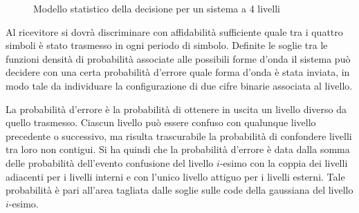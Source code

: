 \begin{figure}[ht!]\centering
	\def\var{.707}
	\caption{Modello statistico della decisione per un sistema a 4 livelli}
	\label{fig:trasmissione_numerica_modello_statistico_decisione_multilivello}
\end{figure}

Al ricevitore si dovrà discriminare con affidabilità sufficiente quale tra i quattro simboli è stato trasmesso in ogni periodo di simbolo. Definite le soglie tra le funzioni densità di probabilità associate alle possibili forme d'onda il sistema può decidere con una certa probabilità d'errore quale forma d'onda è stata inviata, in modo tale da individuare la configurazione di due cifre binarie associata al livello.

La probabilità d'errore è la probabilità di ottenere in uscita un livello diverso da quello trasmesso. Ciascun livello può essere confuso con qualunque livello precedente o successivo, ma risulta trascurabile la probabilità di confondere livelli tra loro non contigui. Si ha quindi che la probabilità d'errore è data dalla somma delle probabilità dell'evento confusione del livello $i$-esimo con la coppia dei livelli adiacenti per i livelli interni e con l'unico livello attiguo per i livelli esterni. Tale probabilità è pari all'area tagliata dalle soglie sulle code della gaussiana del livello $i$-esimo.

